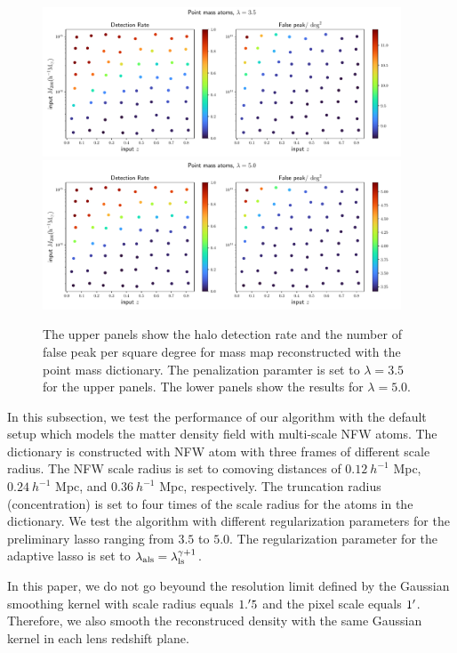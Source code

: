 \documentclass[twocolumn]{aastex62}
\begin{document}
\begin{figure}[!ht]
 \centering
 \includegraphics[width=0.95\textwidth]{detfalseRate_f1-1.pdf}
 \includegraphics[width=0.95\textwidth]{detfalseRate_f1-3.pdf}
 \caption{The upper panels show the halo detection rate and the number of false peak per square degree for mass map 
        reconstructed with the point mass dictionary. The penalization paramter is set to $\lambda=3.5$ for the upper panels. 
        The lower panels show the results for $\lambda=5.0$. 
        }\label{fig-detFalsRatePM}
\end{figure}

In this subsection, we test the performance of our algorithm with the default setup which models the matter density
field with multi-scale NFW atoms. The dictionary is constructed with NFW atom with three frames of different scale radius. 
The NFW scale radius is set to comoving distances of $0.12~h^{-1}$ Mpc, $0.24~h^{-1}$ Mpc, and $0.36~h^{-1}$ Mpc, respectively. 
The truncation radius (concentration) is set to four times of the scale radius for the atoms in the dictionary. We test the 
algorithm with different regularization parameters for the preliminary lasso ranging from $3.5$ to $5.0$. The regularization 
parameter for the adaptive lasso is set to $\lambda_{\rm{als}}=\lambda_{\rm{ls}}^{\gamma+1}$.

In this paper, we do not go beyound the resolution limit defined by the Gaussian smoothing kernel with scale radius equals 
$1.\mbox{$^\prime$} 5$ and the pixel scale equals $1\mbox{$^\prime$}$. Therefore, we also smooth the reconstruced density with the same 
Gaussian kernel in each lens redshift plane.
\end{document}
